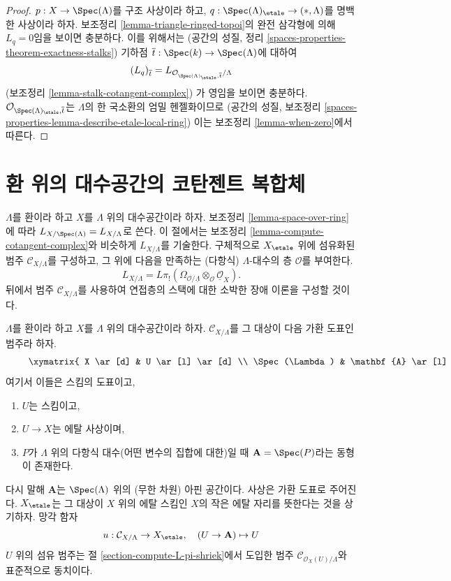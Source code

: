 \begin{proof}
$p : X \to \Spec(\Lambda)$를 구조 사상이라 하고,
$q : \Spec(\Lambda)_\etale \to (*, \Lambda)$를 명백한 사상이라 하자.
보조정리 \ref{lemma-triangle-ringed-topoi}의 완전 삼각형에 의해
$L_q = 0$임을 보이면 충분하다. 이를 위해서는
(공간의 성질, 정리
\ref{spaces-properties-theorem-exactness-stalks})
기하점 $\overline{t} : \Spec(k) \to \Spec(\Lambda)$에 대하여
$$
(L_q)_{\overline{t}} =
L_{\mathcal{O}_{\Spec(\Lambda)_\etale, \overline{t}}/\Lambda}
$$
(보조정리 \ref{lemma-stalk-cotangent-complex})
가 영임을 보이면 충분하다. $\mathcal{O}_{\Spec(\Lambda)_\etale, \overline{t}}$는
$\Lambda$의 한 국소환의 엄밀 헨젤화이므로
(공간의 성질, 보조정리
\ref{spaces-properties-lemma-describe-etale-local-ring})
이는 보조정리 \ref{lemma-when-zero}에서 따른다.
\end{proof}










\section{환 위의 대수공간의 코탄젠트 복합체}
\label{section-cotangent-spaces-variant}

\noindent
$\Lambda$를 환이라 하고 $X$를 $\Lambda$ 위의 대수공간이라 하자.
보조정리 \ref{lemma-space-over-ring}에 따라
$L_{X/\Spec(\Lambda)} = L_{X/\Lambda}$로 쓴다.
이 절에서는 보조정리 \ref{lemma-compute-cotangent-complex}와 비슷하게
$L_{X/\Lambda}$를 기술한다. 구체적으로 $X_\etale$ 위에 섬유화된 범주
$\mathcal{C}_{X/\Lambda}$를 구성하고, 그 위에 다음을 만족하는
(다항식) $\Lambda$-대수의 층 $\mathcal{O}$를 부여한다.
$$
L_{X/\Lambda} =
L\pi_!(\Omega_{\mathcal{O}/\underline{\Lambda}} \otimes_\mathcal{O}
\underline{\mathcal{O}}_X).
$$
뒤에서 범주 $\mathcal{C}_{X/\Lambda}$를 사용하여 연접층의 스택에 대한
소박한 장애 이론을 구성할 것이다.

\medskip\noindent
$\Lambda$를 환이라 하고 $X$를 $\Lambda$ 위의 대수공간이라 하자.
$\mathcal{C}_{X/\Lambda}$를 그 대상이 다음 가환 도표인 범주라 하자.
\begin{equation}
\label{equation-object-space}
\vcenter{
\xymatrix{
X \ar[d] & U \ar[l] \ar[d] \\
\Spec(\Lambda) & \mathbf{A} \ar[l]
}
}
\end{equation}
여기서 이들은 스킴의 도표이고,
\begin{enumerate}
\item $U$는 스킴이고,
\item $U \to X$는 에탈 사상이며,
\item $P$가 $\Lambda$ 위의 다항식 대수(어떤 변수의 집합에 대한)일 때
$\mathbf{A} = \Spec(P)$라는 동형이 존재한다.
\end{enumerate}
다시 말해 $\mathbf{A}$는 $\Spec(\Lambda)$ 위의 (무한 차원) 아핀 공간이다.
사상은 가환 도표로 주어진다. $X_\etale$는 그 대상이 $X$ 위의 에탈
스킴인 $X$의 작은 에탈 자리를 뜻한다는 것을 상기하자.
망각 함자
$$
u : \mathcal{C}_{X/\Lambda} \to X_\etale,
\quad
(U \to \mathbf{A}) \mapsto U
$$
$U$ 위의 섬유 범주는 절 \ref{section-compute-L-pi-shriek}에서 도입한
범주 $\mathcal{C}_{\mathcal{O}_X(U)/\Lambda}$와 표준적으로 동치이다.

